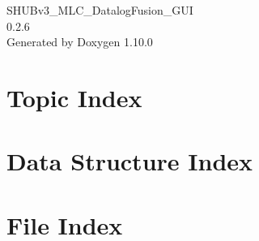 \documentclass[twoside]{book}
\newcommand{\+}{\discretionary{\mbox{\scriptsize$\hookleftarrow$}}{}{}}
\newcommand{\clearemptydoublepage}{%
    \newpage{\pagestyle{empty}\cleardoublepage}%
  }
\begin{document}
  \raggedbottom
    \hypersetup{pageanchor=false,
                bookmarksnumbered=true,
                pdfencoding=unicode
               }
  \begin{titlepage}
  \vspace*{7cm}
  \begin{center}%
  {\Large SHUBv3\+\_\+\+MLC\+\_\+\+Datalog\+Fusion\+\_\+\+GUI}\\
  [1ex]\large 0.\+2.\+6 \\
  \vspace*{1cm}
  {\large Generated by Doxygen 1.10.0}\\
  \end{center}
  \end{titlepage}
  \clearemptydoublepage
  \tableofcontents
  \clearemptydoublepage
  \hypersetup{pageanchor=true}


\chapter{Topic Index}

\chapter{Data Structure Index}

\chapter{File Index}

\end{document}
